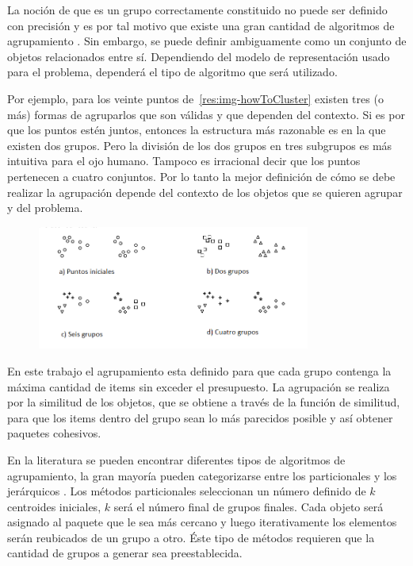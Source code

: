 La noción de que es un grupo correctamente constituido no puede ser definido con precisión y es por tal motivo que existe una gran cantidad de algoritmos de agrupamiento \cite{Estivill-Castro:2002:WSM:568574.568575}. Sin embargo, se puede definir ambiguamente como un conjunto de objetos relacionados entre sí. Dependiendo del modelo de representación usado para el problema, dependerá el tipo de algoritmo que será utilizado.

Por ejemplo, para los veinte puntos de~\autoref{res:img-howToCluster} existen tres (o más) formas de agruparlos que son válidas y que dependen del contexto. Si es por que los puntos estén juntos, entonces la estructura más razonable es en la que existen dos grupos. Pero la división de los dos grupos en tres subgrupos es más intuitiva para el ojo humano. Tampoco es irracional decir que los puntos pertenecen a cuatro conjuntos. Por lo tanto la mejor definición de cómo se debe realizar la agrupación depende del contexto de los objetos que se quieren agrupar y del problema.

\begin{figure}[H]
  \centering
   \includegraphics[width=0.8\textwidth]{img/howToCluster.png}
   \caption{}
   \label{res:img-howToCluster}
\end{figure}
En este trabajo el agrupamiento esta definido para que cada grupo contenga la máxima cantidad de items sin exceder el presupuesto. La agrupación se realiza por la similitud de los objetos, que se obtiene a través de la función de similitud, para que los items dentro del grupo sean lo más parecidos posible y así obtener paquetes cohesivos.

En la literatura se pueden encontrar diferentes tipos de algoritmos de agrupamiento, la gran mayoría pueden categorizarse entre los particionales y los jerárquicos \cite{opac-b1087461}. Los métodos particionales seleccionan un número definido de $k$ centroides iniciales, $k$ será el número final de grupos finales. Cada objeto será asignado al paquete que le sea más cercano y luego iterativamente los elementos serán reubicados de un grupo a otro. Éste tipo de métodos requieren que la cantidad de grupos a generar sea preestablecida. 

